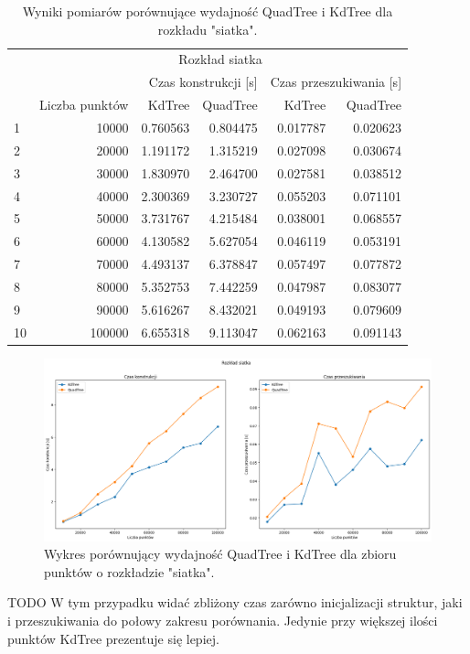 \documentclass{lab}
\begin{document}
\begin{table}[H]
\centering
\begin{tabular}{lrrrrr}
  \toprule
   & \multicolumn{5}{c}{Rozkład siatka} \\
   &  & \multicolumn{2}{r}{Czas konstrukcji [s]} & \multicolumn{2}{r}{Czas przeszukiwania [s]} \\
   & Liczba punktów & KdTree & QuadTree & KdTree & QuadTree \\
  \midrule
1 & 10000 & 0.760563 & 0.804475 & 0.017787 & 0.020623 \\
2 & 20000 & 1.191172 & 1.315219 & 0.027098 & 0.030674 \\
3 & 30000 & 1.830970 & 2.464700 & 0.027581 & 0.038512 \\
4 & 40000 & 2.300369 & 3.230727 & 0.055203 & 0.071101 \\
5 & 50000 & 3.731767 & 4.215484 & 0.038001 & 0.068557 \\
6 & 60000 & 4.130582 & 5.627054 & 0.046119 & 0.053191 \\
7 & 70000 & 4.493137 & 6.378847 & 0.057497 & 0.077872 \\
8 & 80000 & 5.352753 & 7.442259 & 0.047987 & 0.083077 \\
9 & 90000 & 5.616267 & 8.432021 & 0.049193 & 0.079609 \\
10 & 100000 & 6.655318 & 9.113047 & 0.062163 & 0.091143 \\
  \bottomrule
  \end{tabular}
\caption{Wyniki pomiarów porównujące wydajność QuadTree i KdTree dla rozkładu "siatka".}
\label{tab:grid_time}
\end{table}

\begin{figure}[H]
  \centering
  \includegraphics[width=1\textwidth]{resources/grid_graph.png}
  \caption{Wykres porównujący wydajność QuadTree i KdTree dla zbioru punktów o rozkładzie "siatka".}
  \label{fig:grid_graph}
\end{figure}
TODO
W tym przypadku widać zbliżony czas zarówno inicjalizacji struktur, jaki i przeszukiwania do połowy zakresu porównania. Jedynie przy większej ilości punktów KdTree prezentuje się lepiej.
\end{document}
